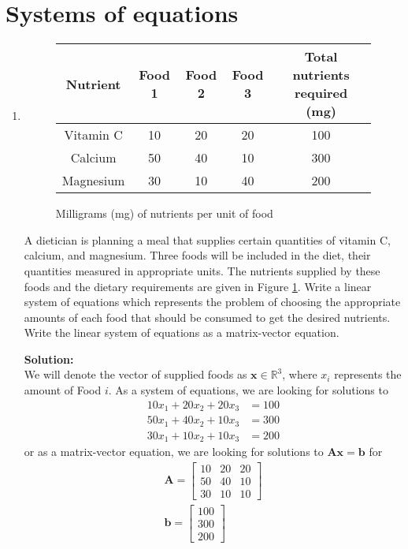 \documentclass[]{article}
\newcommand{\R}{\mathbb{R}}				%
\newcommand{\bbm}{\begin{bmatrix}}		%
\newcommand{\ebm}{\end{bmatrix}}		%
\newcommand{\A}{\bm{A}}					%
\newcommand{\solution}{\vskip 0.5cm \textbf{\large Solution:} \\}
\begin{document}
    \section*{Systems of equations}
    \begin{enumerate}[resume]
	\item \begin{figure}
	  \centering
	  \begin{tabular}{ccccc}
		Nutrient & Food 1 & Food 2 & Food 3 & Total nutrients required (mg) \\ \hline
		Vitamin C & 10 & 20 & 20 & 100 \\
		Calcium & 50 & 40 & 10 & 300 \\
		Magnesium & 30 & 10 & 40 & 200 \\ \hline
	  \end{tabular}
	  \caption{Milligrams (mg) of nutrients per unit of food}
	  \label{fig:diet}
	\end{figure}

	  A dietician is planning a meal that supplies certain quantities of vitamin C, calcium, and magnesium. Three foods will be included in the diet, their quantities measured in appropriate units. The nutrients supplied by these foods and the dietary requirements are given in Figure \ref{fig:diet}. Write a linear system of equations which represents the problem of choosing the appropriate amounts of each food that should be consumed to get the desired nutrients. Write the linear system of equations as a matrix-vector equation.

	  \solution We will denote the vector of supplied foods as $\bm{x}
      \in \R^3$, where $x_i$ represents the amount of Food $i$. As a
      system of equations, we are looking for solutions to
      \[\begin{split}
      10 x_1 + 20 x_2 + 20 x_3 &= 100 \\
      50 x_1 + 40 x_2 + 10 x_3 &= 300 \\
      30 x_1 + 10 x_2 + 10 x_3 &= 200
      \end{split}\]
      or as a matrix-vector equation, we are looking for solutions to $\A \bm{x} = \bm{b}$ for
      \begin{gather*}
        \A = \bbm 10 & 20 & 20 \\ 50 & 40 & 10 \\ 30 & 10 & 10 \ebm \\
        \bm{b} = \bbm 100 \\ 300 \\ 200 \ebm
      \end{gather*}
      



\end{enumerate}
\end{document}
